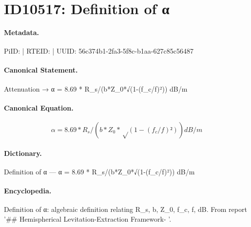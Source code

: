 \section*{ID10517: Definition of α}
\paragraph{Metadata.}
PiID:  | RTEID:  | UUID: 56c374b1-2fa3-5f8c-b1aa-627c85c56487

\paragraph{Canonical Statement.}
Attenuation → α = 8.69 * R\_s/(b*Z\_0*√(1-(f\_c/f)²)) dB/m

\paragraph{Canonical Equation.}
\[
α = 8.69 * R_s/(b*Z_0*√(1-(f_c/f)²)) dB/m
\]

\paragraph{Dictionary.}
Definition of α — α = 8.69 * R\_s/(b*Z\_0*√(1-(f\_c/f)²)) dB/m

\paragraph{Encyclopedia.}
Definition of α: algebraic definition relating R\_s, b, Z\_0, f\_c, f, dB. From report '\#\# Hemispherical Levitation-Extraction Framework- '.
